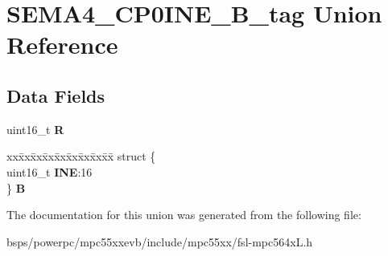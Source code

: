 \hypertarget{unionSEMA4__CP0INE__16B__tag}{}\section{S\+E\+M\+A4\+\_\+\+C\+P0\+I\+N\+E\+\_\+B\+\_\+tag Union Reference}
\label{unionSEMA4__CP0INE__16B__tag}
\subsection*{Data Fields}
\begin{DoxyCompactItemize}
\item 
\mbox{\label{unionSEMA4__CP0INE__16B__tag_a5dc3307e9492d4c53bcd709e2af03867}} 
uint16\+\_\+t {\bfseries R}
\item 
\mbox{\label{unionSEMA4__CP0INE__16B__tag_a666a72945e4d519527fe9da2458b42e4}} 
\begin{tabbing}
xx\=xx\=xx\=xx\=xx\=xx\=xx\=xx\=xx\=\kill
struct \{\\
\>uint16\_t {\bfseries INE}:16\\
\} {\bfseries B}\\

\end{tabbing}\end{DoxyCompactItemize}


The documentation for this union was generated from the following file\+:\begin{DoxyCompactItemize}
\item 
bsps/powerpc/mpc55xxevb/include/mpc55xx/fsl-\/mpc564x\+L.\+h\end{DoxyCompactItemize}
